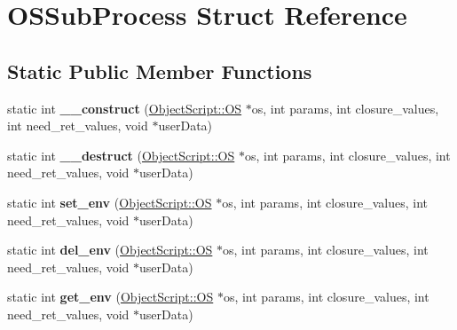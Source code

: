 \hypertarget{struct_o_s_sub_process}{}\section{O\+S\+Sub\+Process Struct Reference}
\label{struct_o_s_sub_process}
\subsection*{Static Public Member Functions}
\begin{DoxyCompactItemize}
\item 
static int {\bfseries \+\_\+\+\_\+construct} (\hyperlink{class_object_script_1_1_o_s}{Object\+Script\+::\+OS} $\ast$os, int params, int closure\+\_\+values, int need\+\_\+ret\+\_\+values, void $\ast$user\+Data)\hypertarget{struct_o_s_sub_process_a542e955d1185c2694bfbac8c41ffdd77}{}\label{struct_o_s_sub_process_a542e955d1185c2694bfbac8c41ffdd77}

\item 
static int {\bfseries \+\_\+\+\_\+destruct} (\hyperlink{class_object_script_1_1_o_s}{Object\+Script\+::\+OS} $\ast$os, int params, int closure\+\_\+values, int need\+\_\+ret\+\_\+values, void $\ast$user\+Data)\hypertarget{struct_o_s_sub_process_a01ef1a44df3b5c5ddbf951e7015b7869}{}\label{struct_o_s_sub_process_a01ef1a44df3b5c5ddbf951e7015b7869}

\item 
static int {\bfseries set\+\_\+env} (\hyperlink{class_object_script_1_1_o_s}{Object\+Script\+::\+OS} $\ast$os, int params, int closure\+\_\+values, int need\+\_\+ret\+\_\+values, void $\ast$user\+Data)\hypertarget{struct_o_s_sub_process_a843fee54de411e0feb9bf0b097437169}{}\label{struct_o_s_sub_process_a843fee54de411e0feb9bf0b097437169}

\item 
static int {\bfseries del\+\_\+env} (\hyperlink{class_object_script_1_1_o_s}{Object\+Script\+::\+OS} $\ast$os, int params, int closure\+\_\+values, int need\+\_\+ret\+\_\+values, void $\ast$user\+Data)\hypertarget{struct_o_s_sub_process_a0e9f8196376f1afc4f5da73b55e4184b}{}\label{struct_o_s_sub_process_a0e9f8196376f1afc4f5da73b55e4184b}

\item 
static int {\bfseries get\+\_\+env} (\hyperlink{class_object_script_1_1_o_s}{Object\+Script\+::\+OS} $\ast$os, int params, int closure\+\_\+values, int need\+\_\+ret\+\_\+values, void $\ast$user\+Data)\hypertarget{struct_o_s_sub_process_ac62ade01f7eeb55ec62c5c732449a368}{}\label{struct_o_s_sub_process_ac62ade01f7eeb55ec62c5c732449a368}


\end{DoxyCompactItemize}
